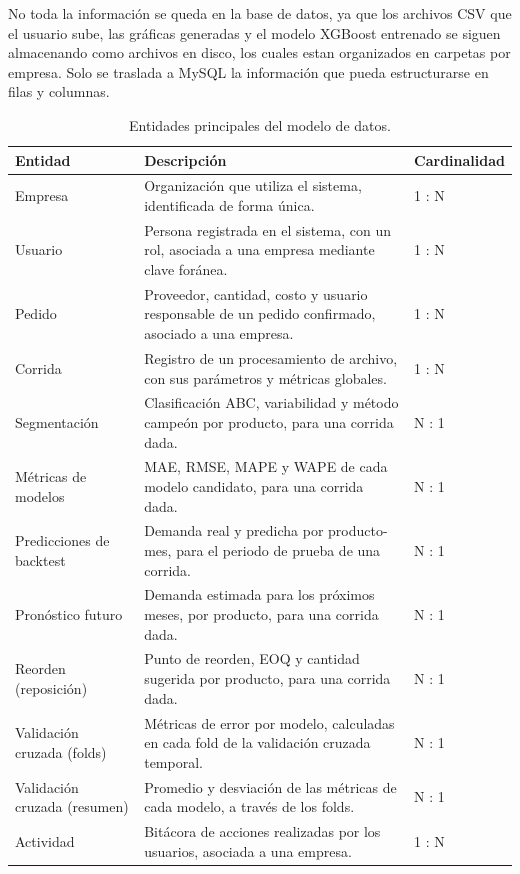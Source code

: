 No toda la información se queda en la base de datos, ya que los archivos CSV que el usuario sube, las gráficas generadas y el modelo XGBoost entrenado se siguen almacenando como archivos en disco, los cuales estan organizados en carpetas por empresa. Solo se traslada a MySQL la información que pueda estructurarse en filas y columnas. 
%
\begin{table}[H]
    \centering
    \caption{Entidades principales del modelo de datos.}
    \label{tab:entidades}
    \renewcommand{\arraystretch}{1.3}
    \begin{tabularx}{\textwidth}{|l|X|l|}
    \hline
    \textbf{Entidad} & \textbf{Descripción} & \textbf{Cardinalidad} \\
    \hline
    Empresa & Organización que utiliza el sistema, identificada de forma única. & 1 : N \\
    \hline
    Usuario & Persona registrada en el sistema, con un rol, asociada a una empresa mediante clave foránea. & 1 : N \\
    \hline
    Pedido & Proveedor, cantidad, costo y usuario responsable de un pedido confirmado, asociado a una empresa. & 1 : N \\
    \hline
    Corrida & Registro de un procesamiento de archivo, con sus parámetros y métricas globales. & 1 : N \\
    \hline
    Segmentación & Clasificación ABC, variabilidad y método campeón por producto, para una corrida dada. & N : 1 \\
    \hline
    Métricas de modelos & MAE, RMSE, MAPE y WAPE de cada modelo candidato, para una corrida dada. & N : 1 \\
    \hline
    Predicciones de backtest & Demanda real y predicha por producto-mes, para el periodo de prueba de una corrida. & N : 1 \\
    \hline
    Pronóstico futuro & Demanda estimada para los próximos meses, por producto, para una corrida dada. & N : 1 \\
    \hline
    Reorden (reposición) & Punto de reorden, EOQ y cantidad sugerida por producto, para una corrida dada. & N : 1 \\
    \hline
    Validación cruzada (folds) & Métricas de error por modelo, calculadas en cada fold de la validación cruzada temporal. & N : 1 \\
    \hline
    Validación cruzada (resumen) & Promedio y desviación de las métricas de cada modelo, a través de los folds. & N : 1 \\
    \hline
    Actividad & Bitácora de acciones realizadas por los usuarios, asociada a una empresa. & 1 : N \\
    \hline
    \end{tabularx}
\end{table}


